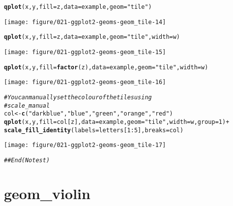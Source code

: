 \documentclass[a4paper,titlepage]{tufte-handout}\usepackage[]{graphicx}\usepackage[]{color}
\makeatletter
\def\maxwidth{ %
  \ifdim\Gin@nat@width>\linewidth
    \linewidth
  \else
    \Gin@nat@width
  \fi
}
\newcommand{\hlnum}[1]{\textcolor[rgb]{0.686,0.059,0.569}{#1}}%
\newcommand{\hlstr}[1]{\textcolor[rgb]{0.192,0.494,0.8}{#1}}%
\newcommand{\hlcom}[1]{\textcolor[rgb]{0.678,0.584,0.686}{\textit{#1}}}%
\newcommand{\hlopt}[1]{\textcolor[rgb]{0,0,0}{#1}}%
\newcommand{\hlstd}[1]{\textcolor[rgb]{0.345,0.345,0.345}{#1}}%
\newcommand{\hlkwb}[1]{\textcolor[rgb]{0.69,0.353,0.396}{#1}}%
\newcommand{\hlkwc}[1]{\textcolor[rgb]{0.333,0.667,0.333}{#1}}%
\newcommand{\hlkwd}[1]{\textcolor[rgb]{0.737,0.353,0.396}{\textbf{#1}}}%
\newenvironment{kframe}{%
 \def\at@end@of@kframe{}%
 \ifinner\ifhmode%
  \def\at@end@of@kframe{\end{minipage}}%
  \begin{minipage}{\columnwidth}%
 \fi\fi%
 \def\FrameCommand##1{\hskip\@totalleftmargin \hskip-\fboxsep
 \colorbox{shadecolor}{##1}\hskip-\fboxsep
     \hskip-\linewidth \hskip-\@totalleftmargin \hskip\columnwidth}%
 \MakeFramed {\advance\hsize-\width
   \@totalleftmargin\z@ \linewidth\hsize
   \@setminipage}}%
 {\par\unskip\endMakeFramed%
 \at@end@of@kframe}
\newenvironment{knitrout}{}{} %
\makeatother
\begin{document}
\begin{knitrout}
\begin{kframe}
\begin{alltt}
\hlkwd{qplot}\hlstd{(x, y,} \hlkwc{fill}\hlstd{=z,} \hlkwc{data}\hlstd{=example,} \hlkwc{geom}\hlstd{=}\hlstr{"tile"}\hlstd{)}
\end{alltt}
\end{kframe}
\texttt{[image: figure/021-ggplot2-geoms-geom\_tile-14]} 
\begin{kframe}\begin{alltt}
\hlkwd{qplot}\hlstd{(x, y,} \hlkwc{fill}\hlstd{=z,} \hlkwc{data}\hlstd{=example,} \hlkwc{geom}\hlstd{=}\hlstr{"tile"}\hlstd{,} \hlkwc{width}\hlstd{=w)}
\end{alltt}
\end{kframe}
\texttt{[image: figure/021-ggplot2-geoms-geom\_tile-15]} 
\begin{kframe}\begin{alltt}
\hlkwd{qplot}\hlstd{(x, y,} \hlkwc{fill}\hlstd{=}\hlkwd{factor}\hlstd{(z),} \hlkwc{data}\hlstd{=example,} \hlkwc{geom}\hlstd{=}\hlstr{"tile"}\hlstd{,} \hlkwc{width}\hlstd{=w)}
\end{alltt}
\end{kframe}
\texttt{[image: figure/021-ggplot2-geoms-geom\_tile-16]} 
\begin{kframe}\begin{alltt}
\hlcom{# You can manually set the colour of the tiles using}
\hlcom{# scale_manual}
\hlstd{col} \hlkwb{<-} \hlkwd{c}\hlstd{(}\hlstr{"darkblue"}\hlstd{,} \hlstr{"blue"}\hlstd{,} \hlstr{"green"}\hlstd{,} \hlstr{"orange"}\hlstd{,} \hlstr{"red"}\hlstd{)}
\hlkwd{qplot}\hlstd{(x, y,} \hlkwc{fill}\hlstd{=col[z],} \hlkwc{data}\hlstd{=example,} \hlkwc{geom}\hlstd{=}\hlstr{"tile"}\hlstd{,} \hlkwc{width}\hlstd{=w,} \hlkwc{group}\hlstd{=}\hlnum{1}\hlstd{)} \hlopt{+}
  \hlkwd{scale_fill_identity}\hlstd{(}\hlkwc{labels}\hlstd{=letters[}\hlnum{1}\hlopt{:}\hlnum{5}\hlstd{],} \hlkwc{breaks}\hlstd{=col)}
\end{alltt}
\end{kframe}
\texttt{[image: figure/021-ggplot2-geoms-geom\_tile-17]} 
\begin{kframe}\begin{alltt}
\hlcom{## End(No test)}
\end{alltt}
\end{kframe}
\end{knitrout}


\section{geom\_violin}
\end{document}
